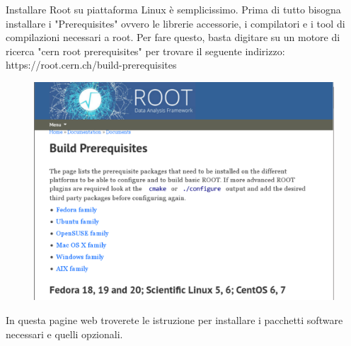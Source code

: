 \documentclass[11pt,fleqn]{book} %
\begin{document}
Installare Root su piattaforma Linux è semplicissimo. Prima di tutto bisogna installare i "Prerequisites" ovvero le librerie accessorie, i compilatori e i tool di compilazioni necessari a root. Per fare questo, basta digitare su un motore di ricerca "cern root prerequisites" per trovare il seguente indirizzo:\\
https://root.cern.ch/build-prerequisites\\
\begin{figure}[h]
\centering
\includegraphics[scale=0.25]{./Pictures/prerequisites.pdf}
\end{figure}
In questa pagine web troverete le istruzione per installare i pacchetti software necessari e quelli opzionali.
\end{document}
